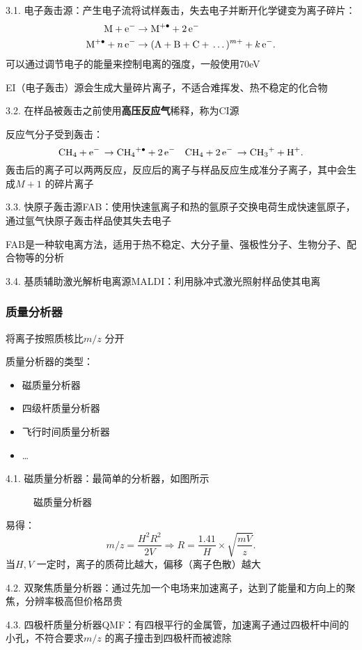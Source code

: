 3.1. 电子轰击源：产生电子流将试样轰击，失去电子并断开化学键变为离子碎片：
\begin{align*}
    \ce{M + e-} &\to \ce{M^{+.} + 2e-}\\
    \ce{M^{+.} + n e-} &\to \ce{(A + B + C + \ldots )^{m+} + k e-}
.\end{align*}
可以通过调节电子的能量来控制电离的强度，一般使用70eV
\begin{notation}
    EI（电子轰击）源会生成大量碎片离子，不适合难挥发、热不稳定的化合物
\end{notation}
3.2. 在样品被轰击之前使用\textbf{高压反应气}稀释，称为CI源
\begin{eg}
    反应气分子受到轰击：\[
        \ce{CH_4 + e- \to CH_4^{+.} + 2e- }\quad \ce{CH_4 + 2e- \to CH_3^{+} + H+}
    .\]
    轰击后的离子可以两两反应，反应后的离子与样品反应生成准分子离子，其中会生成$M+1$ 的碎片离子
\end{eg}
3.3. 快原子轰击源FAB：使用快速氩离子和热的氩原子交换电荷生成快速氩原子，通过氩气快原子轰击样品使其失去电子
\begin{notation}
    FAB是一种软电离方法，适用于热不稳定、大分子量、强极性分子、生物分子、配合物等的分析
\end{notation}
3.4. 基质辅助激光解析电离源MALDI：利用脉冲式激光照射样品使其电离
\subsubsection{质量分析器}%
\label{ssub*:质量分析器}
将离子按照质核比$m / z$ 分开
\begin{notation}
    质量分析器的类型：
    \begin{itemize}
        \item 磁质量分析器
        \item 四级杆质量分析器
        \item 飞行时间质量分析器
        \item \ldots 
    \end{itemize}
\end{notation}
4.1. 磁质量分析器：最简单的分析器，如图所示
\begin{figure}[ht!]
    \centering
    \caption{磁质量分析器}
    \label{fig:磁质量分析器}
\end{figure}
\begin{notation}
    易得：\[
        m / z = \frac{H^2 R^2 }{2V} \Rightarrow R = \frac{1.41}{H}\times \sqrt{\frac{mV}{z}}
    .\]
    当$H,V$ 一定时，离子的质荷比越大，偏移（离子色散）越大
\end{notation}
4.2. 双聚焦质量分析器：通过先加一个电场来加速离子，达到了能量和方向上的聚焦，分辨率极高但价格昂贵

4.3. 四极杆质量分析器QMF：有四根平行的金属管，加速离子通过四极杆中间的小孔，不符合要求$m / z$ 的离子撞击到四极杆而被滤除
